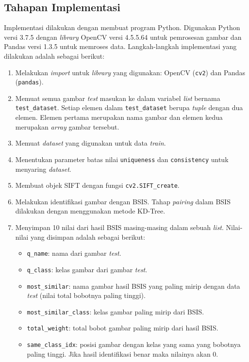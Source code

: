\subsection{Tahapan Implementasi}
\label{subsec:analisis_oir_tahapan_implementasi}
Implementasi dilakukan dengan membuat program Python. Digunakan Python versi 3.7.5 dengan \textit{library} OpenCV versi 4.5.5.64 untuk pemrosesan gambar dan Pandas versi 1.3.5 untuk memroses data. Langkah-langkah implementasi yang dilakukan adalah sebagai berikut:
\begin{enumerate}
	\item Melakukan \textit{import} untuk \textit{library} yang digunakan: OpenCV (\texttt{cv2}) dan Pandas (\texttt{pandas}).
	\item Memuat semua gambar \textit{test} masukan ke dalam variabel \textit{list} bernama \texttt{test\_dataset}. Setiap elemen dalam \texttt{test\_dataset} berupa \textit{tuple} dengan dua elemen. Elemen pertama merupakan nama gambar dan elemen kedua merupakan \textit{array} gambar tersebut.
	\item Memuat \textit{dataset} yang digunakan untuk data \textit{train}.
	\item Menentukan parameter batas nilai \texttt{uniqueness} dan \texttt{consistency} untuk menyaring \textit{dataset}. 
	\item Membuat objek SIFT dengan fungsi \texttt{cv2.SIFT\_create}.
	\item Melakukan identifikasi gambar dengan BSIS. Tahap \textit{pairing} dalam BSIS dilakukan dengan menggunakan metode KD-Tree.
	\item Menyimpan 10 nilai dari hasil BSIS masing-masing dalam sebuah \textit{list}. Nilai-nilai yang disimpan adalah sebagai berikut:
	\begin{itemize}
		\item \texttt{q\_name}: nama dari gambar \textit{test}.
		\item \texttt{q\_class}: kelas gambar dari gambar \textit{test}.
		\item \texttt{most\_similar}: nama gambar hasil BSIS yang paling mirip dengan data \textit{test} (nilai total bobotnya paling tinggi).
		\item \texttt{most\_similar\_class}: kelas gambar paling mirip dari BSIS.
		\item \texttt{total\_weight}: total bobot gambar paling mirip dari hasil BSIS.
		\item \texttt{same\_class\_idx}: posisi gambar dengan kelas yang sama yang bobotnya paling tinggi. Jika hasil identifikasi benar maka nilainya akan 0.

\end{itemize}
\end{enumerate}
